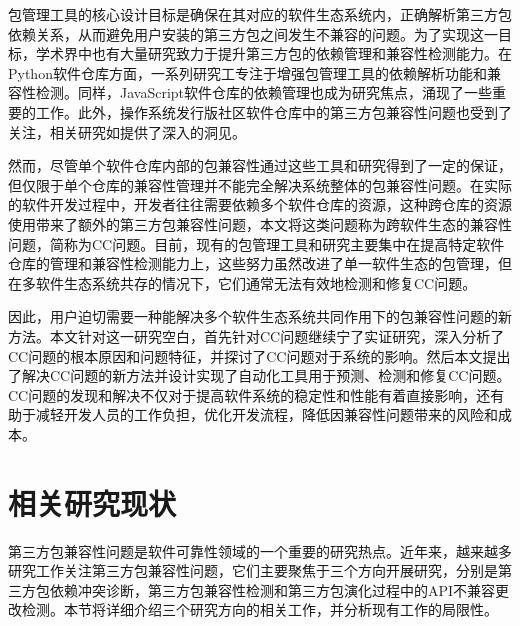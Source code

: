包管理工具的核心设计目标是确保在其对应的软件生态系统内，正确解析第三方包依赖关系，从而避免用户安装的第三方包之间发生不兼容的问题。为了实现这一目标，学术界中也有大量研究致力于提升第三方包的依赖管理和兼容性检测能力。在Python软件仓库方面，一系列研究工专注于增强包管理工具的依赖解析功能和兼容性检测。同样，JavaScript软件仓库的依赖管理也成为研究焦点，涌现了一些重要的工作。此外，操作系统发行版社区软件仓库中的第三方包兼容性问题也受到了关注，相关研究如提供了深入的洞见。

然而，尽管单个软件仓库内部的包兼容性通过这些工具和研究得到了一定的保证，但仅限于单个仓库的兼容性管理并不能完全解决系统整体的包兼容性问题。在实际的软件开发过程中，开发者往往需要依赖多个软件仓库的资源，这种跨仓库的资源使用带来了额外的第三方包兼容性问题，本文将这类问题称为跨软件生态的兼容性问题，简称为CC问题。目前，现有的包管理工具和研究主要集中在提高特定软件仓库的管理和兼容性检测能力上，这些努力虽然改进了单一软件生态的包管理，但在多软件生态系统共存的情况下，它们通常无法有效地检测和修复CC问题。

因此，用户迫切需要一种能解决多个软件生态系统共同作用下的包兼容性问题的新方法。本文针对这一研究空白，首先针对CC问题继续宁了实证研究，深入分析了CC问题的根本原因和问题特征，并探讨了CC问题对于系统的影响。然后本文提出了解决CC问题的新方法并设计实现了自动化工具用于预测、检测和修复CC问题。CC问题的发现和解决不仅对于提高软件系统的稳定性和性能有着直接影响，还有助于减轻开发人员的工作负担，优化开发流程，降低因兼容性问题带来的风险和成本。


\section{相关研究现状}
第三方包兼容性问题是软件可靠性领域的一个重要的研究热点。近年来，越来越多研究工作关注第三方包兼容性问题，它们主要聚焦于三个方向开展研究，分别是第三方包依赖冲突诊断，第三方包兼容性检测和第三方包演化过程中的API不兼容更改检测。本节将详细介绍三个研究方向的相关工作，并分析现有工作的局限性。
